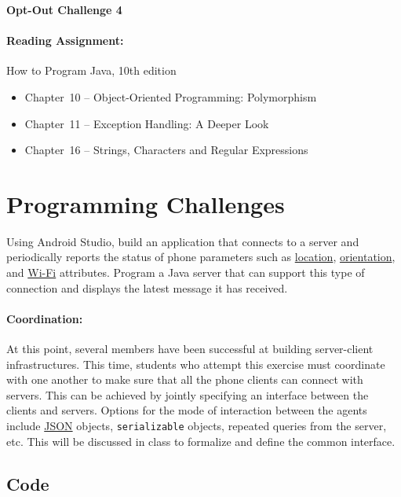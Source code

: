 \documentclass[11pt]{article}
\begin{document}
\begin{center}
{\bfseries \LARGE Opt-Out Challenge 4}
\end{center}

\paragraph{Reading Assignment:}
How to Program Java, 10th edition
\begin{itemize}
\item Chapter~10 -- Object-Oriented Programming: Polymorphism
\item Chapter~11 -- Exception Handling: A Deeper Look
\item Chapter~16 -- Strings, Characters and Regular Expressions
\end{itemize}


\section*{Programming Challenges}

Using Android Studio, build an application that connects to a server and periodically reports the status of phone parameters such as
\href{http://developer.android.com/reference/android/location/LocationManager.html}{location},
\href{http://developer.android.com/reference/android/hardware/SensorManager.html}{orientation},
and \href{http://developer.android.com/reference/android/net/wifi/WifiManager.html}{Wi-Fi} attributes.
Program a Java server that can support this type of connection and displays the latest message it has received.

\paragraph{Coordination:}
At this point, several members have been successful at building server-client infrastructures.
This time, students who attempt this exercise must coordinate with one another to make sure that all the phone clients can connect with servers.
This can be achieved by jointly specifying an interface between the clients and servers.
Options for the mode of interaction between the agents include \href{http://www.json.org/}{JSON} objects, \texttt{serializable} objects, repeated queries from the server, etc.
This will be discussed in class to formalize and define the common interface.


\subsection*{Code}
\end{document}
